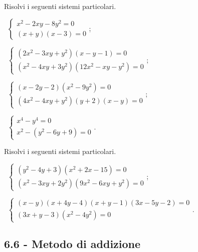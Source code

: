 \begin{esercizio}[\Ast]
 \label{ese:6.59}
Risolvi i seguenti sistemi particolari.
 \begin{enumeratea}
 \item~$\left\{\begin{array}{l}x^2-2xy-8y^2=0\\(x+y)(x-3)=0\end{array}\right.$;
 \item~$\left\{\begin{array}{l}(2x^2-3xy+y^2)(x-y-1)=0 \\(x^2-4xy+3y^2)(12x^2-xy-y^2)=0 \end{array}\right.$;
 \item~$\left\{\begin{array}{l}(x-2y-2)(x^2-9y^2)=0 \\(4x^2-4xy+y^2)(y+2)(x-y)=0 \end{array}\right.$;
 \item~$\left\{\begin{array}{l}x^4-y^4=0 \\x^2-(y^2-6y+9)=0 \end{array}\right.$.
 \end{enumeratea}
\end{esercizio}

\begin{esercizio}[\Ast]
 \label{ese:6.60}
Risolvi i seguenti sistemi particolari.
 \begin{enumeratea}
 \item~$\left\{\begin{array}{l}(y^2-4y+3)(x^2+2x-15)=0 \\(x^2-3xy+2y^2)(9x^2-6xy+y^2)=0 \end{array}\right.$;
 \item~$\left\{\begin{array}{l}(x-y)(x+4y-4)(x+y-1)(3x-5y-2)=0 \\(3x+y-3)(x^2-4y^2)=0 \end{array}\right.$.
 \end{enumeratea}
\end{esercizio}

\subsection*{6.6 - Metodo di addizione}

